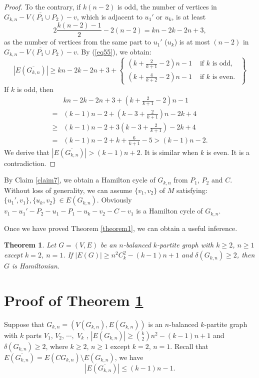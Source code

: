 \documentclass[reqno]{amsart}
\newtheorem{theorem}{Theorem}
\begin{document}
\begin{proof} To the contrary, if $k(n-2)$ is odd,  the number of vertices in $\overline{G_{k,n}-V(P_1\cup P_2)-v}$, which is adjacent to $u_1'$ or $u_k$,  is at least  $$ 2\frac{k(n-2)-1}{2} - 2(n-2)=kn-2k-2n+3,$$
as the number of vertices from the same part to $u_1'$ ($u_k$) is at most $(n-2)$ in $\overline{G_{k,n}-V(P_1\cup P_2)-v}$. By (\ref{eq55}), we obtain:
\begin{equation*} |E(\overline{G_{k,n}})|  \geq kn-2k-2n+3+ \left\{\begin{array}{ll}
\left(k+\frac{2}{k+1}-2\right) n-1 & \text { if } k \text { is odd, }  \\
\left(k+\frac{4}{k+2}-2\right) n-1 & \text { if } k \text { is even. }
 \end{array}\right\}
\end{equation*}
If $k$ is odd, then
\begin{align*}
 & kn-2k-2n+3+ \left(k+\frac{2}{k+1}-2\right)n-1 \\
= &  (k-1)n-2+  \left(k-3+\frac{2}{k+1}\right) n-2k+4 \\
\geq & (k-1)n-2+ 3\left(k-3+\frac{2}{k+1}\right)-2k+4\\
= & (k-1)n-2+ k+\frac{6}{k+1}-5 >(k-1)n-2.
\end{align*}
We derive that $|E(\overline{G_{k,n}})| > (k-1)n+2$. It is similar when $k$ is even. It is a contradiction.
\end{proof}

By Claim \ref{claim7}, we obtain a Hamilton cycle of $G_{k,n}$ from $P_1$, $P_2$ and $C$. Without loss of generality, we can assume $\{v_{1},v_{2}\}$ of $M$ satisfying: $\{u_1',v_1\},\{u_k,v_{2}\}\ \in E(G_{k,n})$. Obviously $v_1-u_1'-P_2-u_1-P_1-u_k-v_2-C-v_1$ is a Hamilton cycle of $G_{k,n}$.

Once we have proved Theorem \ref{theorem1}, we can obtain a useful inference.
\begin{theorem}\label{theorem11} Let \normalsize $G=(V,E)$ be an $n$-balanced $k$-partite graph with $k \geq 2$,  $n \geq 1$ except $k=2$, $n=1$.  If $|E(G)| \geq n^{2} C_{k}^{2}-(k-1) n+1 $ and $\delta(G_{k,n}) \geq 2$, then $G$ is Hamiltonian.
\end{theorem}

\section{ Proof of Theorem \ref{theorem11}}


Suppose that  $G_{k,n}=(V(G_{k,n}),E(G_{k,n}))$ is an $n$-balanced $k$-partite graph with $k$ parts  $V_1$, $V_2$, $\cdots,$ $V_k$ , $|E(G_{k,n})| \geq \binom{k}{2}n^{2}-(k-1) n+1 $ and $\delta(G_{k,n}) \geq 2$, where $k \geq 2$,  $n \geq 1$ except $k=2$, $n=1$. Recall that $E(\overline{G_{k,n}})=E(CG_{k,n})\setminus E(G_{k,n})$,  we have
\begin{equation}\label{eq121}
 |E(\overline{G_{k,n}})| \leq(k-1) n-1.
\end{equation}
\end{document}
